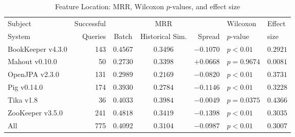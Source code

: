 \begin{table}[t]
\centering
\caption{Feature Location: MRR, Wilcoxon $p$-values, and effect size}
\begin{tabular}{l|r|ccr|ll}
\toprule
Subject & Successful &    & MRR &        & Wilcoxon  & Effect \\
System  & Queries    & Batch & Historical Sim.  & Spread & $p$-value & size \\
\midrule
BookKeeper v4.3.0 & 143 & $\bm{0.4567}$ & $0.3496$ & $-0.1070$ & $p < 0.01$ & $0.2921$ \\
Mahout v0.10.0 & 50 & $0.2730$ & $\bm{0.3398}$ & $+0.0668$ & $p = 0.9674$ & $0.0081$ \\
OpenJPA v2.3.0 & 131 & $\bm{0.2989}$ & $0.2169$ & $-0.0820$ & $p < 0.01$ & $0.3731$ \\
Pig v0.14.0 & 174 & $\bm{0.3930}$ & $0.2784$ & $-0.1146$ & $p < 0.01$ & $0.3228$ \\
Tika v1.8 & 36 & $\bm{0.4033}$ & $0.3984$ & $-0.0049$ & $p = 0.0375$ & $0.4366$ \\
ZooKeeper v3.5.0 & 241 & $\bm{0.4818}$ & $0.3419$ & $-0.1398$ & $p < 0.01$ & $0.3035$ \\
\midrule
All & 775 & $\bm{0.4092}$ & $0.3104$ & $-0.0987$ & $p < 0.01$ & $0.3007$ \\
\bottomrule
\end{tabular}
\label{table:feature_location_rq2}
\end{table}
